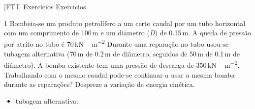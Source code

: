 \documentclass[\mainfilename]{subfiles}
\begin{document}
[FT\,I]
{Exercicios}
{Exercicios}

\begin{questionBox}1{ %
    Bombeia-se um produto petrolífero a um certo caudal por um tubo horizontal com um comprimento de 100\,\unit{\metre} e um diametro (\textit{D}) de 0.15\,\unit{\metre}. A queda de pressão por atrito no tubo é 70\,\unit{\kilo\newton\,\metre^{-2}} Durante uma reparação no tubo usou-se tubagem alternativa (70\,\unit{\metre} de 0.2\,\unit{\metre} de diâmetro, seguidos de 50\,\unit{\metre} de 0.1\,\unit{\metre} de diâmetro). A bomba existente tem uma pressão de descarga de 350\,\unit{\kilo\newton\,\metre^{-2}}. Trabalhando com o mesmo caudal pode-se continuar a usar a mesma bomba durante as reparações? Despreze a variação de energia cinética. 
} %
    
    \begin{itemize}
        \item tubagem alternativa: 
        \begin{itemize}
        \end{itemize}
    \end{itemize}


\end{questionBox}
\end{document}

